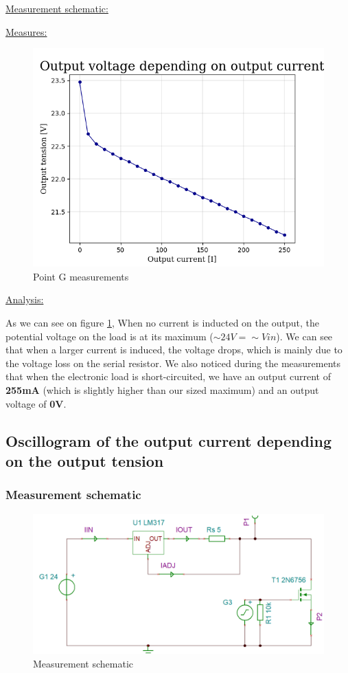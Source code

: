 {\clearpage

\underline{Measurement schematic:}


\underline{Measures:}
\begin{figure}[h]
	\centering
	\includegraphics[width=0.8\linewidth]{../../Grph-pointG}
	\caption{Point G measurements}
	\label{fig:grph-pointg}
\end{figure}

\underline{Analysis:}

As we can see on figure \ref{fig:grph-pointg}, When no current is inducted on the output, the potential voltage on the load is at its maximum (\textbf{$\sim 24V = \sim Vin$}). We can see that when a larger current is induced, the voltage drops, which is mainly due to the voltage loss on the serial resistor. We also noticed during the measurements that when the electronic load is short-circuited, we have an output current of \textbf{255mA} (which is slightly higher than our sized maximum) and an output voltage of \textbf{0V}.


}

\newpage
\subsection{Oscillogram of the output current depending on the output tension} \label{ssec:num13}
{
	\subsubsection{Measurement schematic}
	\begin{figure}[h]
		\centering
		\includegraphics[width=0.8\linewidth]{../../schemaMesurePulses}
		\caption{Measurement schematic}
		\label{fig:schemamesurepulses}
	\end{figure}
}

